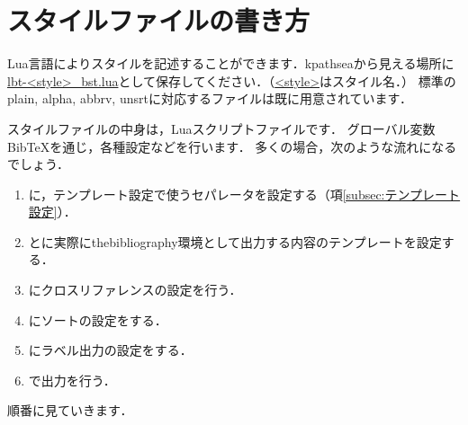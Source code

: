 \documentclass[a4paper]{ltjsarticle}
\begin{document}
\section{スタイルファイルの書き方}
Lua言語によりスタイルを記述することができます．kpathseaから見える場所に\url{lbt-<style>_bst.lua}として保存してください．（\url{<style>}はスタイル名．）
標準のplain, alpha, abbrv, unsrtに対応するファイルは既に用意されています．

スタイルファイルの中身は，Luaスクリプトファイルです．
グローバル変数BibTeXを通じ，各種設定などを行います．
多くの場合，次のような流れになるでしょう．
\begin{enumerate}
\item {}に，テンプレート設定で使うセパレータを設定する（項\ref{subsec:テンプレート設定}）．
\item {}とに実際にthebibliography環境として出力する内容のテンプレートを設定する．
\item {}にクロスリファレンスの設定を行う．
\item {}にソートの設定をする．
\item {}にラベル出力の設定をする．
\item {}で出力を行う．
\end{enumerate}
順番に見ていきます．


%
%
%
%
%
%
\end{document}
